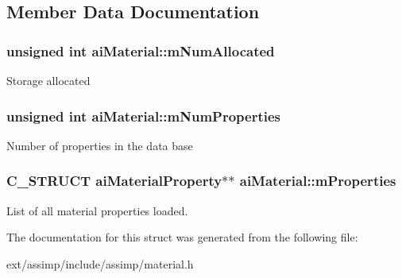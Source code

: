 \subsection{Member Data Documentation}
\hypertarget{structai_material_a84a0016a263362c52b27a9d8d76dc449}{
\subsubsection[{m\-Num\-Allocated}]{\setlength{\rightskip}{0pt plus 5cm}unsigned int ai\-Material\-::m\-Num\-Allocated}}\label{structai_material_a84a0016a263362c52b27a9d8d76dc449}
Storage allocated \hypertarget{structai_material_a243b07afdc6507f8878c93a2cafe4963}{
\subsubsection[{m\-Num\-Properties}]{\setlength{\rightskip}{0pt plus 5cm}unsigned int ai\-Material\-::m\-Num\-Properties}}\label{structai_material_a243b07afdc6507f8878c93a2cafe4963}
Number of properties in the data base \hypertarget{structai_material_af32b125d54bff5bc1fc54a1007487cab}{
\subsubsection[{m\-Properties}]{\setlength{\rightskip}{0pt plus 5cm}C\-\_\-\-S\-T\-R\-U\-C\-T ai\-Material\-Property$\ast$$\ast$ ai\-Material\-::m\-Properties}}\label{structai_material_af32b125d54bff5bc1fc54a1007487cab}
List of all material properties loaded. 

The documentation for this struct was generated from the following file\-:\begin{DoxyCompactItemize}
\item 
ext/assimp/include/assimp/material.\-h\end{DoxyCompactItemize}
